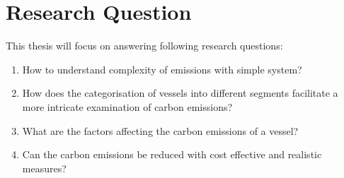 \section{Research Question}

This thesis will focus on answering following research questions:

\begin{enumerate}
    \item How to understand complexity of emissions with simple system?
    \item How does the categorisation of vessels into different segments facilitate a more intricate examination of carbon emissions?
    \item What are the factors affecting the carbon emissions of a vessel?
    \item Can the carbon emissions be reduced with cost effective and realistic measures?
\end{enumerate}